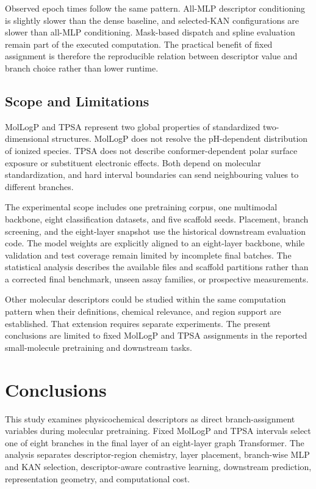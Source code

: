 \documentclass[journal=jcisd8,manuscript=article]{achemso}
\begin{document}
Observed epoch times follow the same pattern. All-MLP descriptor conditioning is slightly slower than the dense baseline, and selected-KAN configurations are slower than all-MLP conditioning. Mask-based dispatch and spline evaluation remain part of the executed computation. The practical benefit of fixed assignment is therefore the reproducible relation between descriptor value and branch choice rather than lower runtime.

\subsection{Scope and Limitations}

MolLogP and TPSA represent two global properties of standardized two-dimensional structures. MolLogP does not resolve the pH-dependent distribution of ionized species. TPSA does not describe conformer-dependent polar surface exposure or substituent electronic effects. Both depend on molecular standardization, and hard interval boundaries can send neighbouring values to different branches.

The experimental scope includes one pretraining corpus, one multimodal backbone, eight classification datasets, and five scaffold seeds. Placement, branch screening, and the eight-layer snapshot use the historical downstream evaluation code. The model weights are explicitly aligned to an eight-layer backbone, while validation and test coverage remain limited by incomplete final batches. The statistical analysis describes the available files and scaffold partitions rather than a corrected final benchmark, unseen assay families, or prospective measurements.

Other molecular descriptors could be studied within the same computation pattern when their definitions, chemical relevance, and region support are established. That extension requires separate experiments. The present conclusions are limited to fixed MolLogP and TPSA assignments in the reported small-molecule pretraining and downstream tasks.

\section{Conclusions}

This study examines physicochemical descriptors as direct branch-assignment variables during molecular pretraining. Fixed MolLogP and TPSA intervals select one of eight branches in the final layer of an eight-layer graph Transformer. The analysis separates descriptor-region chemistry, layer placement, branch-wise MLP and KAN selection, descriptor-aware contrastive learning, downstream prediction, representation geometry, and computational cost.
\end{document}
